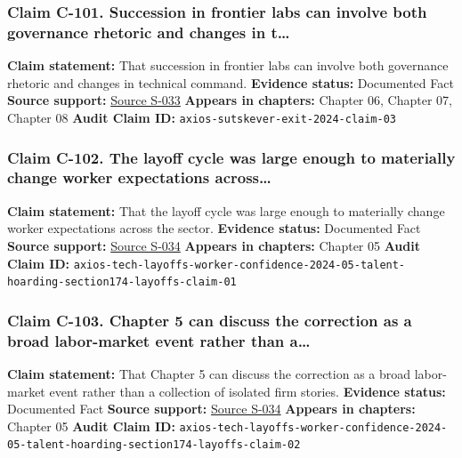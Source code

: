 \documentclass[
  american,
  11pt,
  letterpaper,
]{article}
\begin{document}
\subsubsection{Claim C-101. Succession in frontier labs can involve both
governance rhetoric and changes in
t\ldots{}}\label{claim-c-101-succession-in-frontier-labs-can-involve-both-governance-rhetoric-and-changes-in-t}

\textbf{Claim statement:} That succession in frontier labs can involve
both governance rhetoric and changes in technical command.
\textbf{Evidence status:} Documented Fact \textbf{Source support:}
\hyperref[source-s-033-openai-co-founder-ilya-sutskever-to-exit-firm]{Source
S-033} \textbf{Appears in chapters:} Chapter 06, Chapter 07, Chapter 08
\textbf{Audit Claim ID:} \texttt{axios-sutskever-exit-2024-claim-03}

\subsubsection{Claim C-102. The layoff cycle was large enough to
materially change worker expectations
across\ldots{}}\label{claim-c-102-the-layoff-cycle-was-large-enough-to-materially-change-worker-expectations-across}

\textbf{Claim statement:} That the layoff cycle was large enough to
materially change worker expectations across the sector.
\textbf{Evidence status:} Documented Fact \textbf{Source support:}
\hyperref[source-s-034-big-tech-layoffs-shattered-industry-worker-confidence]{Source
S-034} \textbf{Appears in chapters:} Chapter 05 \textbf{Audit Claim ID:}
\texttt{axios-tech-layoffs-worker-confidence-2024-05-talent-hoarding-section174-layoffs-claim-01}

\subsubsection{Claim C-103. Chapter 5 can discuss the correction as a
broad labor-market event rather than
a\ldots{}}\label{claim-c-103-chapter-5-can-discuss-the-correction-as-a-broad-labor-market-event-rather-than-a}

\textbf{Claim statement:} That Chapter 5 can discuss the correction as a
broad labor-market event rather than a collection of isolated firm
stories. \textbf{Evidence status:} Documented Fact \textbf{Source
support:}
\hyperref[source-s-034-big-tech-layoffs-shattered-industry-worker-confidence]{Source
S-034} \textbf{Appears in chapters:} Chapter 05 \textbf{Audit Claim ID:}
\texttt{axios-tech-layoffs-worker-confidence-2024-05-talent-hoarding-section174-layoffs-claim-02}
\end{document}
